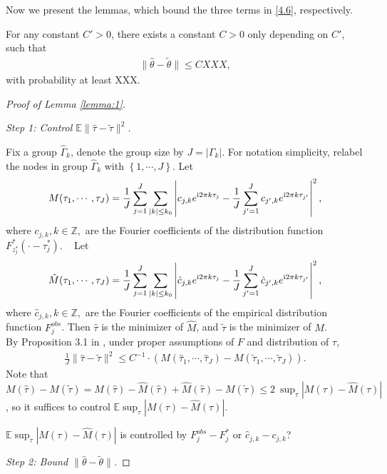 Now we present the lemmas, which bound the three terms in \eqref{4.6}, respectively. 
\begin{lemma}\label{lemma:1}
For any constant $C'>0$, there exists a constant $C>0$ only depending on $C'$, such that
\begin{align*}
\|\hat \theta - \tilde{\theta} \| \leq C XXX,
\end{align*}
with probability at least XXX.
\end{lemma}

\begin{proof}[Proof of Lemma \ref{lemma:1}]
~

\textit{Step 1: Control $\mathbb{E}\|\hat\tau - \tilde\tau\|^2$.}

Fix a group $\hat\Gamma_k$, denote the group size by $J=|\Gamma_k|$.
For notation simplicity, relabel the nodes in group $\hat\Gamma_k$ with $\left\{ 1,\cdots,J \right\}$.
Let 
\begin{align*}
M(\tau_1,\cdots,\tau_{J}) 
= \frac{1}{J}\sum_{j=1}^J 
\sum_{|k|\leq k_0} \left| 
 c_{j,k} e^{\complexunit{}2\pi k \tau_j} 
 - \frac{1}{J}\sum_{j'=1}^J c_{j',k} e^{\complexunit{}2\pi k \tau_{j'}} 
 \right|^2,
\end{align*}
where $c_{j,k},k\in\mathbb{Z},$ are the Fourier coefficients of the distribution function $F^*_{z^*_j}(\cdot-\tau^*_j)$.
~
Let 
\begin{align*}
\hat M(\tau_1,\cdots,\tau_{J}) 
= \frac{1}{J}\sum_{j=1}^J 
\sum_{|k|\leq k_0} \left| 
 \hat c_{j,k} e^{\complexunit{}2\pi k \tau_j} 
 - \frac{1}{J}\sum_{j'=1}^J \hat c_{j',k} e^{\complexunit{}2\pi k \tau_{j'}} 
 \right|^2,
\end{align*}
where $\hat c_{j,k},k\in\mathbb{Z},$ are the Fourier coefficients of the empirical distribution function $F^{obs}_j$.
Then $\hat\tau$ is the minimizer of $\hat M$, and $\tilde\tau$ is the minimizer of $M$.
\\
By Proposition 3.1 in \citet{Bigot2013}, under proper assumptions of $F$ and distribution of $\tau$, 
\begin{align*}
\frac{1}{J}\|\hat\tau-\tilde\tau\|^2\leq C^{-1}\cdot(M(\hat\tau_1,\cdots,\hat\tau_J)-M(\tilde\tau_1,\cdots,\tilde\tau_J)).
\end{align*}
Note that $M(\hat\tau)-M(\tilde{\tau})=M(\hat\tau)-\hat M(\hat{\tau})+\hat M(\hat{\tau})-M(\tilde{\tau})\leq 2~\sup_{\tau}|M(\tau)-\hat M(\tau)| $, so it suffices to control
$\mathbb{E}\sup_{\tau}|M(\tau)-\hat M(\tau)|$.

$\mathbb{E}\sup_{\tau}|M(\tau)-\hat M(\tau)|$ is controlled by $F_j^{obs}-F^*_j$ or $\hat c_{j,k}-c_{j,k}$?

\textit{Step 2: Bound $\|\hat \theta - \tilde \theta\|$.}




\end{proof}


